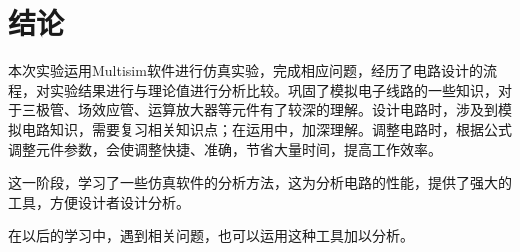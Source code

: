 \chapter{结论}%
\label{cha:结论}

本次实验运用Multisim软件进行仿真实验，完成相应问题，经历了电路设计的流程，对实验结果进行与理论值进行分析比较。巩固了模拟电子线路的一些知识，对于三极管、场效应管、运算放大器等元件有了较深的理解。设计电路时，涉及到模拟电路知识，需要复习相关知识点；在运用中，加深理解。调整电路时，根据公式调整元件参数，会使调整快捷、准确，节省大量时间，提高工作效率。

这一阶段，学习了一些仿真软件的分析方法，这为分析电路的性能，提供了强大的工具，方便设计者设计分析。

在以后的学习中，遇到相关问题，也可以运用这种工具加以分析。

